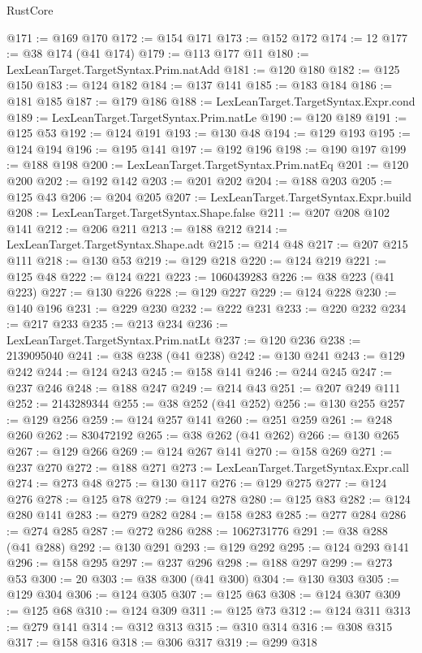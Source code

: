 \begin{lexlean}{RustCore}
\begin{coremodule}
@171 := @169 @170
@172 := @154 @171
@173 := @152 @172
@174 := 12
@177 := @38 @174 (@41 @174)
@179 := @113 @177 @11
@180 := LexLeanTarget.TargetSyntax.Prim.natAdd
@181 := @120 @180
@182 := @125 @150
@183 := @124 @182
@184 := @137 @141
@185 := @183 @184
@186 := @181 @185
@187 := @179 @186
@188 := LexLeanTarget.TargetSyntax.Expr.cond
@189 := LexLeanTarget.TargetSyntax.Prim.natLe
@190 := @120 @189
@191 := @125 @53
@192 := @124 @191
@193 := @130 @48
@194 := @129 @193
@195 := @124 @194
@196 := @195 @141
@197 := @192 @196
@198 := @190 @197
@199 := @188 @198
@200 := LexLeanTarget.TargetSyntax.Prim.natEq
@201 := @120 @200
@202 := @192 @142
@203 := @201 @202
@204 := @188 @203
@205 := @125 @43
@206 := @204 @205
@207 := LexLeanTarget.TargetSyntax.Expr.build
@208 := LexLeanTarget.TargetSyntax.Shape.false
@211 := @207 @208 @102 @141
@212 := @206 @211
@213 := @188 @212
@214 := LexLeanTarget.TargetSyntax.Shape.adt
@215 := @214 @48
@217 := @207 @215 @111
@218 := @130 @53
@219 := @129 @218
@220 := @124 @219
@221 := @125 @48
@222 := @124 @221
@223 := 1060439283
@226 := @38 @223 (@41 @223)
@227 := @130 @226
@228 := @129 @227
@229 := @124 @228
@230 := @140 @196
@231 := @229 @230
@232 := @222 @231
@233 := @220 @232
@234 := @217 @233
@235 := @213 @234
@236 := LexLeanTarget.TargetSyntax.Prim.natLt
@237 := @120 @236
@238 := 2139095040
@241 := @38 @238 (@41 @238)
@242 := @130 @241
@243 := @129 @242
@244 := @124 @243
@245 := @158 @141
@246 := @244 @245
@247 := @237 @246
@248 := @188 @247
@249 := @214 @43
@251 := @207 @249 @111
@252 := 2143289344
@255 := @38 @252 (@41 @252)
@256 := @130 @255
@257 := @129 @256
@259 := @124 @257 @141
@260 := @251 @259
@261 := @248 @260
@262 := 830472192
@265 := @38 @262 (@41 @262)
@266 := @130 @265
@267 := @129 @266
@269 := @124 @267 @141
@270 := @158 @269
@271 := @237 @270
@272 := @188 @271
@273 := LexLeanTarget.TargetSyntax.Expr.call
@274 := @273 @48
@275 := @130 @117
@276 := @129 @275
@277 := @124 @276
@278 := @125 @78
@279 := @124 @278
@280 := @125 @83
@282 := @124 @280 @141
@283 := @279 @282
@284 := @158 @283
@285 := @277 @284
@286 := @274 @285
@287 := @272 @286
@288 := 1062731776
@291 := @38 @288 (@41 @288)
@292 := @130 @291
@293 := @129 @292
@295 := @124 @293 @141
@296 := @158 @295
@297 := @237 @296
@298 := @188 @297
@299 := @273 @53
@300 := 20
@303 := @38 @300 (@41 @300)
@304 := @130 @303
@305 := @129 @304
@306 := @124 @305
@307 := @125 @63
@308 := @124 @307
@309 := @125 @68
@310 := @124 @309
@311 := @125 @73
@312 := @124 @311
@313 := @279 @141
@314 := @312 @313
@315 := @310 @314
@316 := @308 @315
@317 := @158 @316
@318 := @306 @317
@319 := @299 @318

\end{coremodule}
\end{lexlean}
